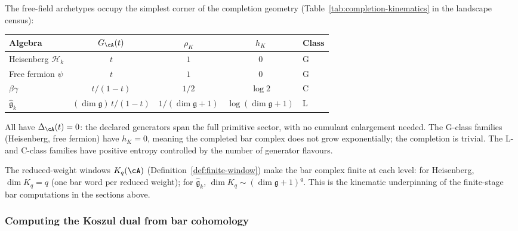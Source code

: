 \begin{remark}
\label{rem:free-field-completion-kinematics}
The free-field archetypes occupy the simplest corner of the completion
geometry
(Table~\ref{tab:completion-kinematics} in the landscape census):
\begin{center}
\small
\begin{tabular}{lcccl}
\textbf{Algebra} & $G_\cA(t)$ & $\rho_K$ & $h_K$ & \textbf{Class} \\
\hline
Heisenberg $\mathcal{H}_k$
 & $t$ & $1$ & $0$ & G \\
Free fermion $\psi$
 & $t$ & $1$ & $0$ & G \\
$\beta\gamma$
 & $t/(1-t)$ & $1/2$ & $\log 2$ & C \\
$\hat{\mathfrak{g}}_k$
 & $(\dim\mathfrak{g})\,t/(1{-}t)$ & $1/(\dim\mathfrak{g}+1)$ & $\log(\dim\mathfrak{g}+1)$ & L \\
\end{tabular}
\end{center}
All have $\Delta_\cA(t) = 0$: the declared generators span the
full primitive sector, with no cumulant enlargement needed. The
G-class families (Heisenberg, free fermion) have $h_K = 0$, meaning
the completed bar complex does not grow exponentially; the
completion is trivial. The L- and C-class families have positive
entropy controlled by the number of generator flavours.

The reduced-weight windows $K_q(\cA)$
(Definition~\ref{def:finite-window}) make the bar complex finite at
each level: for Heisenberg, $\dim K_q = q$ (one bar word per reduced
weight); for $\hat{\mathfrak{g}}_k$, $\dim K_q \sim
(\dim\mathfrak{g}+1)^q$. This is the kinematic underpinning of the
finite-stage bar computations in the sections above.
\end{remark}

\subsubsection{Computing the Koszul dual from bar cohomology}

